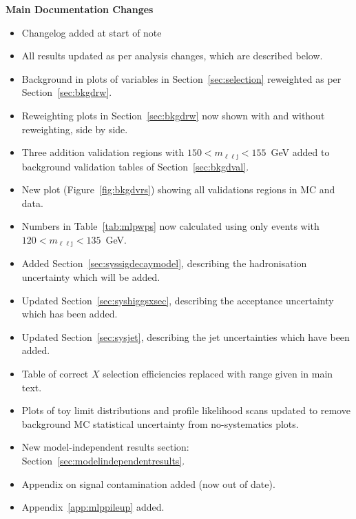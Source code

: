 \documentclass[NOTE, atlasdraft=true, texlive=2017, UKenglish]{\ATLASLATEXPATH atlasdoc}
\begin{document}
\textbf{Main Documentation Changes}
\begin{itemize}
\item Changelog added at start of note
\item All results updated as per analysis changes, which are described below.
\item Background in plots of variables in Section~\ref{sec:selection} reweighted as per Section~\ref{sec:bkgdrw}.
\item Reweighting plots in Section~\ref{sec:bkgdrw} now shown with and without reweighting, side by side.
\item Three addition validation regions with $150<m_{\ell\ell\text{j}}<155$~GeV added to background validation tables of Section~\ref{sec:bkgdval}.
\item New plot (Figure~\ref{fig:bkgdvrs}) showing all validations regions in MC and data.
\item Numbers in Table~\ref{tab:mlpwps} now calculated using only events with $120<m_{\ell\ell\text{j}}<135$~GeV.
\item Added Section~\ref{sec:syssigdecaymodel}, describing the hadronisation uncertainty which will be added.
\item Updated Section~\ref{sec:syshiggsxsec}, describing the acceptance uncertainty which has been added.
\item Updated Section~\ref{sec:sysjet}, describing the jet uncertainties which have been added.
\item Table of correct $X$ selection efficiencies replaced with range given in main text.
\item Plots of toy limit distributions and profile likelihood scans updated to remove background MC statistical uncertainty from no-systematics plots.
\item New model-independent results section: Section~\ref{sec:modelindependentresults}.
\item Appendix on signal contamination added (now out of date).
\item Appendix~\ref{app:mlppileup} added.
\end{itemize}
\end{document}
